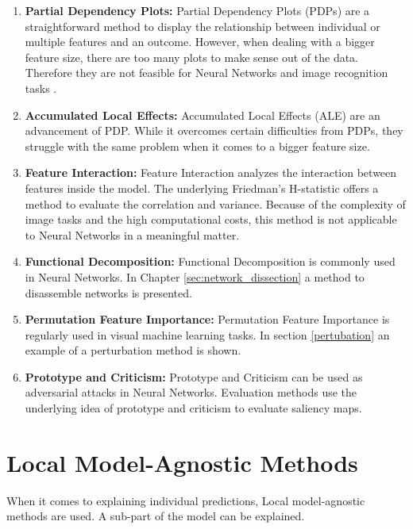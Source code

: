 \begin{enumerate}
	\item \textbf{Partial Dependency Plots:} Partial Dependency Plots (PDPs) are a straightforward method to display the relationship between individual or multiple features and an outcome. However, when dealing with a bigger feature size, there are too many plots to make sense out of the data. Therefore they are not feasible for Neural Networks and image recognition tasks \cite{PDP}.
	\item \textbf{Accumulated Local Effects:} Accumulated Local Effects (ALE) are an advancement of PDP. While it overcomes certain difficulties from PDPs, they struggle with the same problem when it comes to a bigger feature size.
	\item \textbf{Feature Interaction:} Feature Interaction analyzes the interaction between features inside the model. The underlying Friedman's H-statistic offers a method to evaluate the correlation and variance. Because of the complexity of image tasks and the high computational costs, this method is not applicable to Neural Networks in a meaningful matter.
	\item \textbf{Functional Decomposition:} Functional Decomposition is commonly used in Neural Networks. In Chapter \ref{sec:network_dissection} a method to disassemble networks is presented.
	\item \textbf{Permutation Feature Importance:} Permutation Feature Importance is regularly used in visual machine learning tasks. In section \ref{pertubation} an example of a perturbation method is shown.
	\item \textbf{Prototype and Criticism:} Prototype and Criticism can be used as adversarial attacks in Neural Networks. \cite{xu2019adversarial} Evaluation methods use the underlying idea of prototype and criticism to evaluate saliency maps.
	
\end{enumerate}


\section{Local Model-Agnostic Methods}

When it comes to explaining individual predictions, Local model-agnostic methods are used. A sub-part of the model can be explained.

